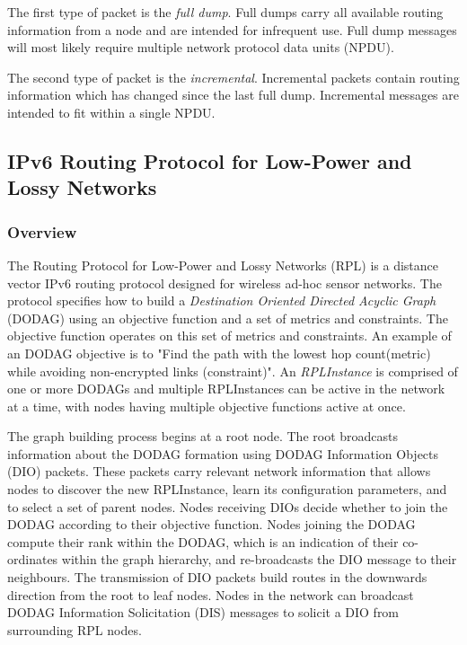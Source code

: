     The first type of packet is the \textit{full dump}. Full dumps carry all
    available routing information from a node and are intended for infrequent
    use. Full dump messages will most likely require multiple network protocol data
    units (NPDU).

    The second type of packet is the \textit{incremental}. Incremental packets
    contain routing information which has changed since the last full dump.
    Incremental messages are intended to fit within a single NPDU.

      \subsection{IPv6 Routing Protocol for Low-Power and Lossy Networks}
        \subsubsection{Overview}
    The Routing Protocol for Low-Power and Lossy Networks (RPL) \cite{RFC6550} is
    a distance vector IPv6 routing protocol designed for wireless ad-hoc
    sensor networks. The protocol specifies how to build
    a \textit{Destination Oriented Directed Acyclic Graph} (DODAG) using an objective
    function and a set of metrics and constraints. The objective function operates
    on this set of metrics and constraints. An example of an DODAG objective is
    to "Find the path with the lowest hop count(metric) while avoiding non-encrypted
    links (constraint)". An \textit{RPLInstance} is comprised of one or more DODAGs
    and multiple RPLInstances can be active in the network at a time, with nodes
    having multiple objective functions active at once.

    The graph building process begins at a root node. The root broadcasts information
    about the DODAG formation using DODAG Information Objects (DIO) packets. These
    packets carry relevant network information that allows nodes to discover the
    new RPLInstance, learn its configuration parameters, and to select a set of
    parent nodes. Nodes receiving DIOs decide whether to join the DODAG according
    to their objective function. Nodes joining the DODAG compute their rank within
    the DODAG, which is an indication of their co-ordinates within the graph hierarchy,
    and re-broadcasts the DIO message to their neighbours. The transmission of DIO packets
    build routes in the downwards direction from the root to leaf nodes. Nodes in
    the network can broadcast DODAG Information Solicitation (DIS) messages
    to solicit a DIO from surrounding RPL nodes.

